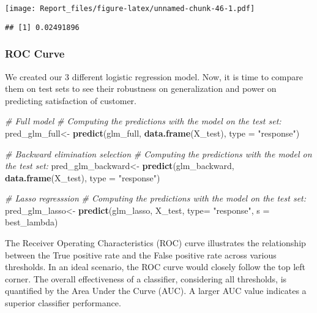 \documentclass[
]{article}
\newenvironment{Shaded}{\begin{snugshade}}{\end{snugshade}}
\newcommand{\AttributeTok}[1]{\textcolor[rgb]{0.13,0.29,0.53}{#1}}
\newcommand{\CommentTok}[1]{\textcolor[rgb]{0.56,0.35,0.01}{\textit{#1}}}
\newcommand{\FunctionTok}[1]{\textcolor[rgb]{0.13,0.29,0.53}{\textbf{#1}}}
\newcommand{\NormalTok}[1]{#1}
\newcommand{\OtherTok}[1]{\textcolor[rgb]{0.56,0.35,0.01}{#1}}
\newcommand{\SpecialCharTok}[1]{\textcolor[rgb]{0.81,0.36,0.00}{\textbf{#1}}}
\newcommand{\StringTok}[1]{\textcolor[rgb]{0.31,0.60,0.02}{#1}}
\begin{document}
\texttt{[image: Report\_files/figure-latex/unnamed-chunk-46-1.pdf]}

\begin{Shaded}
\end{Shaded}

\begin{verbatim}
## [1] 0.02491896
\end{verbatim}

\hypertarget{roc-curve}{%
\subsubsection{ROC Curve}\label{roc-curve}}

We created our 3 different logistic regression model. Now, it is time to
compare them on test sets to see their robustness on generalization and
power on predicting satisfaction of customer.

\begin{Shaded}
\begin{Highlighting}[]
\CommentTok{\# Full model}
\CommentTok{\# Computing the predictions with the model on the test set:}
\NormalTok{pred\_glm\_full}\OtherTok{\textless{}{-}} \FunctionTok{predict}\NormalTok{(glm\_full, }\FunctionTok{data.frame}\NormalTok{(X\_test), }\AttributeTok{type =} \StringTok{"response"}\NormalTok{)}

\CommentTok{\# Backward elimination selection}
\CommentTok{\# Computing the predictions with the model on the test set:}
\NormalTok{pred\_glm\_backward}\OtherTok{\textless{}{-}} \FunctionTok{predict}\NormalTok{(glm\_backward, }\FunctionTok{data.frame}\NormalTok{(X\_test), }\AttributeTok{type =} \StringTok{"response"}\NormalTok{)}

\CommentTok{\# Lasso regresssion}
\CommentTok{\# Computing the predictions with the model on the test set:}
\NormalTok{pred\_glm\_lasso}\OtherTok{\textless{}{-}} \FunctionTok{predict}\NormalTok{(glm\_lasso, X\_test, }\AttributeTok{type=} \StringTok{"response"}\NormalTok{, }\AttributeTok{s =}\NormalTok{ best\_lambda)}
\end{Highlighting}
\end{Shaded}

The Receiver Operating Characteristics (ROC) curve illustrates the
relationship between the True positive rate and the False positive rate
across various thresholds. In an ideal scenario, the ROC curve would
closely follow the top left corner. The overall effectiveness of a
classifier, considering all thresholds, is quantified by the Area Under
the Curve (AUC). A larger AUC value indicates a superior classifier
performance.
\end{document}
